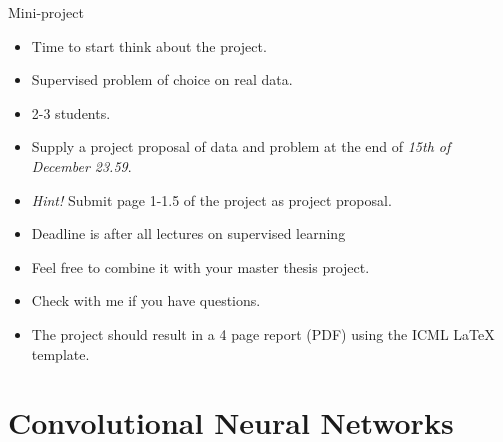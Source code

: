 \documentclass[10pt]{beamer}
\begin{document}
\begin{frame}{Mini-project}

\begin{itemize}
\item Time to start think about the project.\pause
\item {\color{uured} Supervised} problem of choice on {\color{uured} real data}.\pause
\item 2-3 students.\pause
\item Supply a {\color{uured} project proposal} of data and problem at the end of \emph{15th of December 23.59}.
\item \emph{Hint!} Submit page 1-1.5 of the project as project proposal.
\item Deadline is after all lectures on supervised learning\pause
\item Feel free to combine it with your master thesis project.\pause
\item Check with me if you have questions.
\item The project should result in a 4 page report (PDF) using the {\color{uured} ICML LaTeX template}.
\end{itemize}
\end{frame}


\section{Convolutional Neural Networks}

\end{document}
